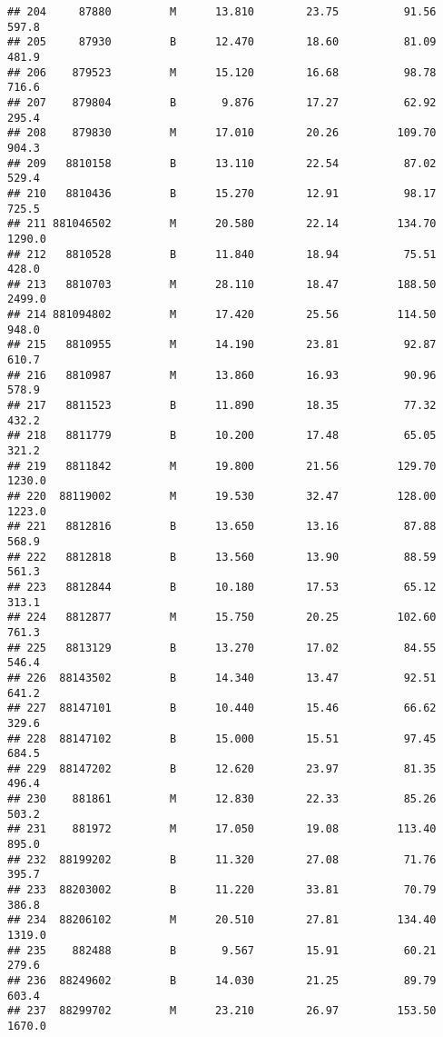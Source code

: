 \documentclass[
]{article}
\begin{document}
\begin{verbatim}
## 204     87880         M      13.810        23.75          91.56     597.8
## 205     87930         B      12.470        18.60          81.09     481.9
## 206    879523         M      15.120        16.68          98.78     716.6
## 207    879804         B       9.876        17.27          62.92     295.4
## 208    879830         M      17.010        20.26         109.70     904.3
## 209   8810158         B      13.110        22.54          87.02     529.4
## 210   8810436         B      15.270        12.91          98.17     725.5
## 211 881046502         M      20.580        22.14         134.70    1290.0
## 212   8810528         B      11.840        18.94          75.51     428.0
## 213   8810703         M      28.110        18.47         188.50    2499.0
## 214 881094802         M      17.420        25.56         114.50     948.0
## 215   8810955         M      14.190        23.81          92.87     610.7
## 216   8810987         M      13.860        16.93          90.96     578.9
## 217   8811523         B      11.890        18.35          77.32     432.2
## 218   8811779         B      10.200        17.48          65.05     321.2
## 219   8811842         M      19.800        21.56         129.70    1230.0
## 220  88119002         M      19.530        32.47         128.00    1223.0
## 221   8812816         B      13.650        13.16          87.88     568.9
## 222   8812818         B      13.560        13.90          88.59     561.3
## 223   8812844         B      10.180        17.53          65.12     313.1
## 224   8812877         M      15.750        20.25         102.60     761.3
## 225   8813129         B      13.270        17.02          84.55     546.4
## 226  88143502         B      14.340        13.47          92.51     641.2
## 227  88147101         B      10.440        15.46          66.62     329.6
## 228  88147102         B      15.000        15.51          97.45     684.5
## 229  88147202         B      12.620        23.97          81.35     496.4
## 230    881861         M      12.830        22.33          85.26     503.2
## 231    881972         M      17.050        19.08         113.40     895.0
## 232  88199202         B      11.320        27.08          71.76     395.7
## 233  88203002         B      11.220        33.81          70.79     386.8
## 234  88206102         M      20.510        27.81         134.40    1319.0
## 235    882488         B       9.567        15.91          60.21     279.6
## 236  88249602         B      14.030        21.25          89.79     603.4
## 237  88299702         M      23.210        26.97         153.50    1670.0

\end{verbatim}
\end{document}
